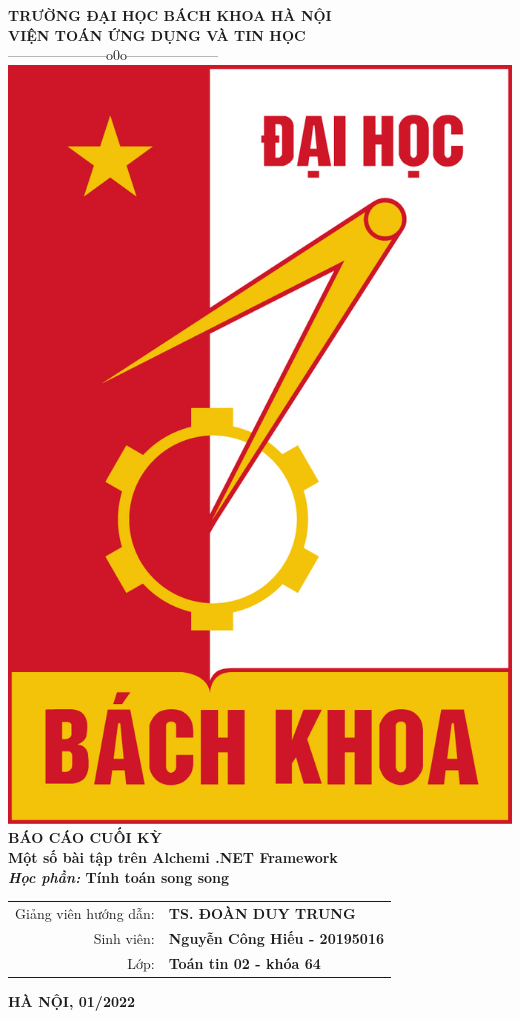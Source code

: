 \documentclass[12pt,a4paper]{report}
\begin{document}
 

\fontsize{13pt}{18pt}\selectfont   %

\setlength{\baselineskip}{18truept}
\begin{titlepage}                                                       %
\begin{center}
{\large\bf TRƯỜNG ĐẠI HỌC BÁCH KHOA HÀ NỘI}\\
{\large\bf VIỆN TOÁN ỨNG DỤNG VÀ TIN HỌC} \\
{---------------------o0o--------------------}
\vskip 1cm
\includegraphics[scale=0.4]{Figures/HUST}
\vskip 2cm
{\bf BÁO CÁO CUỐI KỲ}\\[1cm]
{\Large\bf \textbf{Một số bài tập trên Alchemi .NET Framework}}\\
\vskip 1cm
{\bf {\it Học phần:}  Tính toán song song}
\vskip 2cm

\begin{tabular}{r l}
Giảng viên hướng dẫn:&{\bf TS. ĐOÀN DUY TRUNG}\\[0.5cm]
Sinh viên:&{\bf Nguyễn Công Hiếu - 20195016}\\[0.5cm]
Lớp:&{\bf Toán tin 02 - khóa 64}
\end{tabular}
\vfill
{\bf HÀ NỘI, 01/2022}
\end{center}
\end{titlepage}
\end{document}
